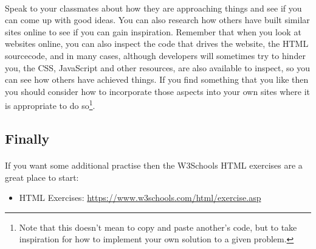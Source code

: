 \documentclass[10pt, a4paper]{article}
\begin{document}
\paragraph{} Speak to your classmates about how they are approaching things and see if you can come up with good ideas. You can also research how others have built similar sites online to see if you can gain inspiration. Remember that when you look at websites online, you can also inspect the code that drives the website, the HTML sourcecode, and in many cases, although developers will sometimes try to hinder you, the CSS, JavaScript and other resources, are also available to inspect, so you can see how others have achieved things. If you find something that you like then you should consider how to incorporate those aspects into your own sites where it is appropriate to do so\footnote{Note that this doesn't mean to copy and paste another's code, but to take inspiration for how to implement your own solution to a given problem.}.

\subsection{Finally}
\paragraph{} If you want some additional practise then the W3Schools HTML exercises are a great place to start:

\begin{itemize}
\item HTML Exercises: \url{https://www.w3schools.com/html/exercise.asp}
\end{itemize}





%

%
\end{document}
